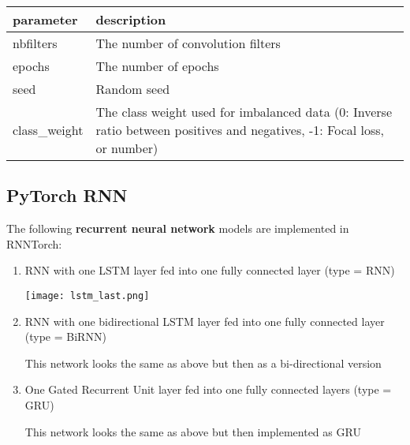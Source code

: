\documentclass[
]{article}
\begin{document}
\begin{longtable}[]{@{}ll@{}}
\toprule
\begin{minipage}[b]{0.26\columnwidth}\raggedright
parameter\strut
\end{minipage} & \begin{minipage}[b]{0.68\columnwidth}\raggedright
description\strut
\end{minipage}\tabularnewline
\midrule
\endhead
\begin{minipage}[t]{0.26\columnwidth}\raggedright
nbfilters\strut
\end{minipage} & \begin{minipage}[t]{0.68\columnwidth}\raggedright
The number of convolution filters\strut
\end{minipage}\tabularnewline
\begin{minipage}[t]{0.26\columnwidth}\raggedright
epochs\strut
\end{minipage} & \begin{minipage}[t]{0.68\columnwidth}\raggedright
The number of epochs\strut
\end{minipage}\tabularnewline
\begin{minipage}[t]{0.26\columnwidth}\raggedright
seed\strut
\end{minipage} & \begin{minipage}[t]{0.68\columnwidth}\raggedright
Random seed\strut
\end{minipage}\tabularnewline
\begin{minipage}[t]{0.26\columnwidth}\raggedright
class\_weight\strut
\end{minipage} & \begin{minipage}[t]{0.68\columnwidth}\raggedright
The class weight used for imbalanced data (0: Inverse ratio between
positives and negatives, -1: Focal loss, or number)\strut
\end{minipage}\tabularnewline
\bottomrule
\end{longtable}

\hypertarget{pytorch-rnn}{%
\subsection{PyTorch RNN}\label{pytorch-rnn}}

The following \textbf{recurrent neural network} models are implemented
in RNNTorch:

\begin{enumerate}
\def\labelenumi{\arabic{enumi})}
\item
  RNN with one LSTM layer fed into one fully connected layer (type =
  RNN)

  \texttt{[image: lstm\_last.png]}
\item
  RNN with one bidirectional LSTM layer fed into one fully connected
  layer (type = BiRNN)

  This network looks the same as above but then as a bi-directional
  version
\item
  One Gated Recurrent Unit layer fed into one fully connected layers
  (type = GRU)

  This network looks the same as above but then implemented as GRU
\end{enumerate}
\end{document}
